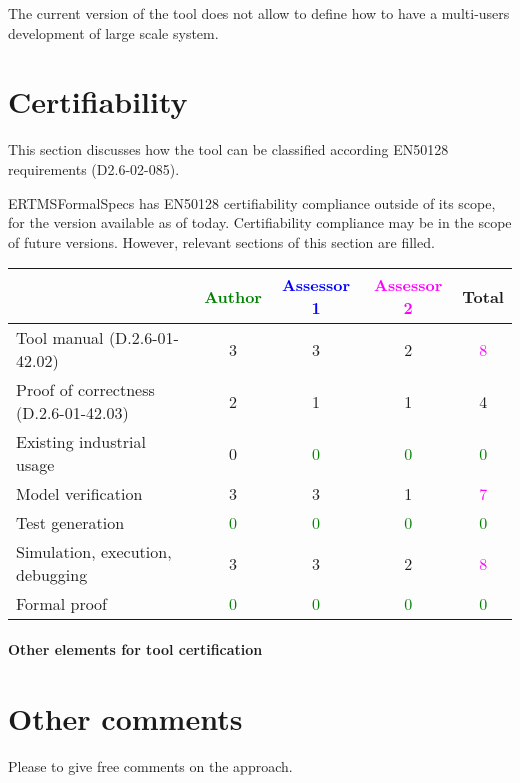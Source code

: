 \begin{assessor2}
The current version of the tool does not allow to  define how to  have a multi-users development of large scale system.
\end{assessor2}

\section{Certifiability}

This section discusses how the tool can be classified according EN50128 requirements (D2.6-02-085).

\begin{author_comment}
ERTMSFormalSpecs has EN50128 certifiability compliance outside of its scope, for the version available as of today. Certifiability compliance may be in the scope of future versions. However, relevant sections of this section are filled.
\end{author_comment}

\begin{tabular}{|l | c | c | c | c|}
\hline
& \textcolor{green}{Author} & \textcolor{blue}{Assessor 1} & \textcolor{magenta}{Assessor 2} & Total \\
\hline 
Tool manual (D.2.6-01-42.02) & 3    & 3    & 2    & \textcolor{magenta}{8}  \\
\hline
Proof of correctness (D.2.6-01-42.03) & 2    & 1    & 1    & 4    \\
\hline
Existing industrial  usage &  0 & \textcolor{green}{0} & \textcolor{green}{0} & \textcolor{green}{0} \\
\hline
Model verification & 3    & 3    & 1    & \textcolor{magenta}{7} \\
\hline
Test generation & \textcolor{green}{0} & \textcolor{green}{0} & \textcolor{green}{0} & \textcolor{green}{0} \\
\hline
Simulation, execution, debugging & 3    & 3    & 2    & \textcolor{magenta}{8} \\
\hline
Formal proof & \textcolor{green}{0} & \textcolor{green}{0} & \textcolor{green}{0} & \textcolor{green}{0} \\
\hline
\end{tabular}

\paragraph{Other elements for tool certification}

\section{Other comments}
Please to  give free comments on the approach.

